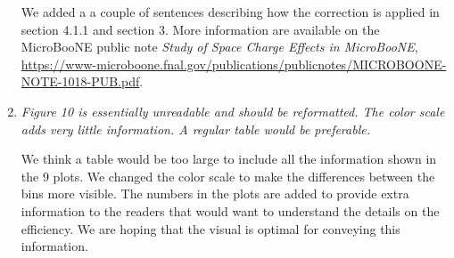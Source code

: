 \documentclass[review,number,sort&compress]{article}
\begin{document}
\begin{enumerate}
We added a a couple of sentences describing how the correction is applied in section 4.1.1 and section 3. More information are available on the MicroBooNE public note \textit{Study of Space Charge Effects in MicroBooNE}, \url{https://www-microboone.fnal.gov/publications/publicnotes/MICROBOONE-NOTE-1018-PUB.pdf}.

\item \emph{Figure 10 is essentially unreadable and should be reformatted. The color scale adds very little information. A regular table would be preferable.}

We think a table would be too large to include all the information shown in the 9 plots. We changed the color scale to make the differences between the bins more visible.
The numbers in the plots are added to provide extra information to the readers that would want to understand the details on the efficiency. We are hoping that the visual is optimal for conveying this information.


\end{enumerate}
\end{document}
